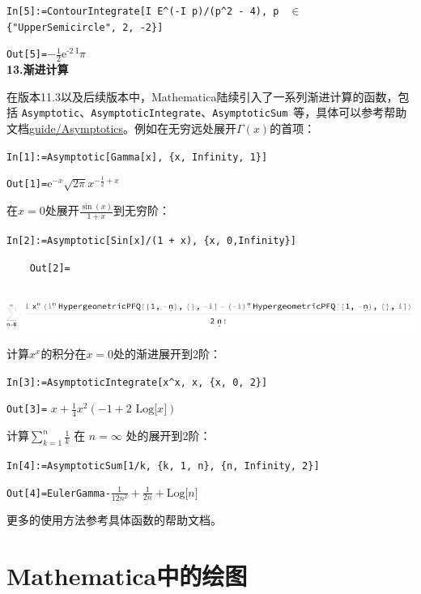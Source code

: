 \documentclass[UTF8,a4paper,10pt]{ctexart}
\newcommand{\mma}{Mathematica}
\begin{document}
\verb|In[5]:=ContourIntegrate[I E^(-I p)/(p^2 - 4), p | $\in$ \verb| {"UpperSemicircle", 2, -2}]|

\verb|Out[5]=|$-\frac{1}{2} \text{e}^\text{-2 I} \pi$   
\\

\textbf{13.渐进计算}

在版本11.3以及后续版本中，\mma 陆续引入了一系列渐进计算的函数，包括 \verb|Asymptotic|、\verb|AsymptoticIntegrate|、\verb|AsymptoticSum|~等，具体可以参考帮助文档\href{http://reference.wolfram.com/language/guide/Asymptotics.html}{guide/Asymptotics}。例如在无穷远处展开$\Gamma(x)$的首项：

\verb|In[1]:=Asymptotic[Gamma[x], {x, Infinity, 1}]|

\verb|Out[1]=|$\text{e}^{-x}\sqrt{2\pi}x^{-\frac{1}{2}+x}$

在$x=0$处展开$\frac{\sin(x)}{1+x}$到无穷阶：

\verb|In[2]:=Asymptotic[Sin[x]/(1 + x), {x, 0,Infinity}]| 

\noindent
\begin{minipage}[c]{0.1cm}
\verb|    Out[2]=|
\\\\
\end{minipage}
\hfill
\begin{minipage}[b]{14.3cm}\ccwd
\includegraphics[height=0.94cm]{img/Asymptotic.pdf}
\end{minipage}

计算$x^x$的积分在$x=0$处的渐进展开到2阶：

\verb|In[3]:=AsymptoticIntegrate[x^x, x, {x, 0, 2}]|   

\verb|Out[3]=| $x+\frac{1}{4}x^2(-1+\text{2 Log[}x])$  

计算$\sum_{k=1}^n \frac{1}{k}$ 在 $n=\infty$ 处的展开到2阶：

\verb|In[4]:=AsymptoticSum[1/k, {k, 1, n}, {n, Infinity, 2}]|

\verb|Out[4]=EulerGamma-|$\frac{1}{12n^2}+\frac{1}{2n}+\text{Log[}n]$

更多的使用方法参考具体函数的帮助文档。




\section{Mathematica中的绘图}
\end{document}
